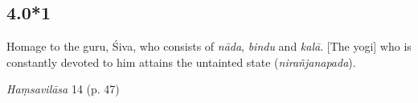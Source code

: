 

\pagestyle{HPed}
\begin{ekdosis}


\subsection*{4.0*1}
\begin{translation}[hp04_000_1] 
Homage to the guru, Śiva, who consists of \emph{nāda}, \emph{bindu} and \emph{kalā}. [The yogi] who is constantly devoted to him attains the untainted state (\emph{nirañjanapada}).
\end{translation}


\begin{testimonia}[hp04_000_1]
\emph{Haṃsavilāsa} 14 (p. 47)
\begin{versinnote}
\end{versinnote}
\end{testimonia}

\begin{philcomm}[hp04_000_1]




\end{philcomm}
\end{ekdosis}
